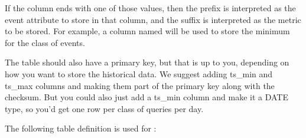 \documentclass[letterpaper,10pt,english]{sphinxmanual}
\begin{document}
\begin{fulllineitems}
\sphinxAtStartPar
If the column ends with one of those values, then the prefix is interpreted as
the event attribute to store in that column, and the suffix is interpreted as
the metric to be stored.  For example, a column named  will be
used to store the minimum  for the class of events.

\sphinxAtStartPar
The table should also have a primary key, but that is up to you, depending on
how you want to store the historical data.  We suggest adding ts\_min and ts\_max
columns and making them part of the primary key along with the checksum.  But
you could also just add a ts\_min column and make it a DATE type, so you’d get
one row per class of queries per day.

\sphinxAtStartPar
The following table definition is used for {\hyperref[\detokenize{mariadb-query-digest:cmdoption-mariadb-query-digest-no-create-history-table}]{}}:


\end{fulllineitems}
\end{document}
